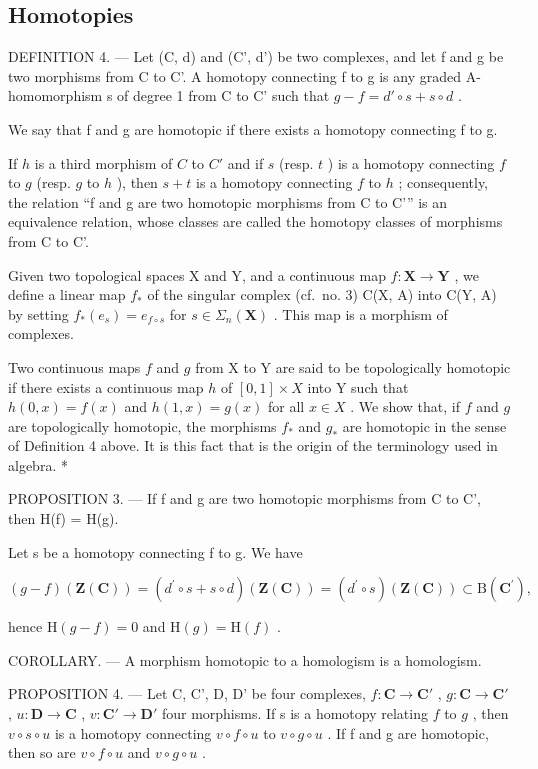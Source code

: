 \subsection{Homotopies}

DEFINITION 4. --- Let (C, d) and (C', d') be two complexes, and let f and g be two morphisms from C to C'. A homotopy connecting f to g is any graded A-homomorphism s of degree 1 from C to C' such that \(g - f = d' \circ s + s \circ d\) .

We say that f and g are homotopic if there exists a homotopy connecting f to g.

If \(h\) is a third morphism of \(C\) to \(C'\) and if \(s\) (resp. \(t\) ) is a homotopy connecting \(f\) to \(g\) (resp. \(g\) to \(h\) ), then \(s + t\) is a homotopy connecting \(f\) to \(h\) ; consequently, the relation “f and g are two homotopic morphisms from C to C'” is an equivalence relation, whose classes are called the homotopy classes of morphisms from C to C'.

Given two topological spaces X and Y, and a continuous map \(f: \mathbf{X} \to \mathbf{Y}\) , we define a linear map \(f_{*}\) of the singular complex (cf.~no. 3) C(X, A) into C(Y, A) by setting \(f_{*}(e_{s}) = e_{f \circ s}\) for \(s \in \Sigma_{n}(\mathbf{X})\) . This map is a morphism of complexes.

Two continuous maps \(f\) and \(g\) from X to Y are said to be topologically homotopic if there exists a continuous map \(h\) of \([0, 1] \times X\) into Y such that \(h(0, x) = f(x)\) and \(h(1, x) = g(x)\) for all \(x \in X\) . We show that, if \(f\) and \(g\) are topologically homotopic, the morphisms \(f_*\) and \(g_*\) are homotopic in the sense of Definition 4 above. It is this fact that is the origin of the terminology used in algebra. *

PROPOSITION 3. --- If f and g are two homotopic morphisms from C to C', then H(f) = H(g).

Let s be a homotopy connecting f to g. We have

\[
(g - f) (\mathbf {Z} (\mathbf {C})) = (d ^ {\prime} \circ s + s \circ d) (\mathbf {Z} (\mathbf {C})) = (d ^ {\prime} \circ s) (\mathbf {Z} (\mathbf {C})) \subset \mathrm{B} (\mathbf {C} ^ {\prime}),
\]

hence \(\mathrm{H}(g - f) = 0\) and \(\mathrm{H}(g) = \mathrm{H}(f)\) .

COROLLARY. --- A morphism homotopic to a homologism is a homologism.

PROPOSITION 4. --- Let C, C', D, D' be four complexes, \(f: \mathbf{C} \to \mathbf{C}'\) , \(g: \mathbf{C} \to \mathbf{C}'\) , \(u: \mathbf{D} \to \mathbf{C}\) , \(v: \mathbf{C}' \to \mathbf{D}'\) four morphisms. If s is a homotopy relating \(f\) to \(g\) , then \(v \circ s \circ u\) is a homotopy connecting \(v \circ f \circ u\) to \(v \circ g \circ u\) . If f and g are homotopic, then so are \(v \circ f \circ u\) and \(v \circ g \circ u\) .


